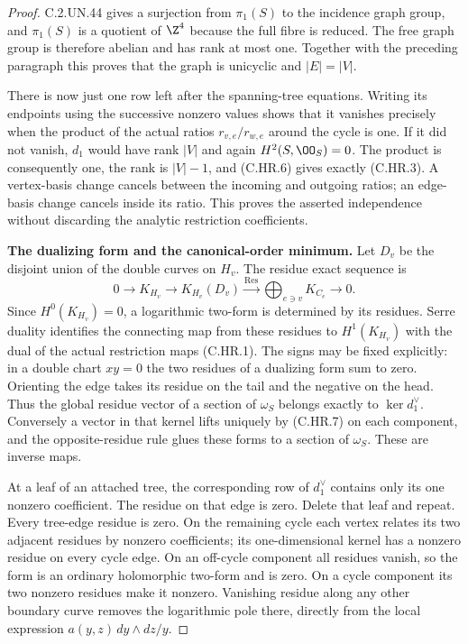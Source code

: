 \begin{proof}
C.2.UN.44 gives a surjection from $\pi_1(S)$ to the incidence
graph group, and $\pi_1(S)$ is a quotient of $\Z^4$ because the
full fibre is reduced. The free graph group is therefore abelian
and has rank at most one. Together with the preceding paragraph
this proves that the graph is unicyclic and $|E|=|V|$.

There is now just one row left after the spanning-tree equations.
Writing its endpoints using the successive nonzero values shows
that it vanishes precisely when the product of the actual ratios
$r_{v,e}/r_{w,e}$ around the cycle is one. If it did not vanish,
$d_1$ would have rank $|V|$ and again $H^2(S,\OO_S)=0$.
The product is consequently one, the rank is $|V|-1$, and
(C.HR.6) gives exactly (C.HR.3). A vertex-basis change cancels
between the incoming and outgoing ratios; an edge-basis change
cancels inside its ratio. This proves the asserted independence
without discarding the analytic restriction coefficients.

\par\medskip\noindent\textbf{The dualizing form and the canonical-order minimum.}
Let $D_v$ be the disjoint union of the double curves on $H_v$.
The residue exact sequence is
\[
 0\longrightarrow K_{H_v}
 \longrightarrow K_{H_v}(D_v)
 \xrightarrow{\operatorname{Res}}\bigoplus_{e\ni v}K_{C_e}
 \longrightarrow0.                                    \tag{C.HR.7}
\]
Since $H^0(K_{H_v})=0$, a logarithmic two-form is determined by
its residues. Serre duality identifies the connecting map from
these residues to $H^1(K_{H_v})$ with the dual of the actual
restriction maps (C.HR.1). The signs may be fixed explicitly:
in a double chart $xy=0$ the two residues of a dualizing form
sum to zero. Orienting the edge takes its residue on the tail
and the negative on the head. Thus the global residue vector of
a section of $\omega_S$ belongs exactly to $\ker d_1^\vee$.
Conversely a vector in that kernel lifts uniquely by (C.HR.7) on
each component, and the opposite-residue rule glues these forms
to a section of $\omega_S$. These are inverse maps.

At a leaf of an attached tree, the corresponding row of
$d_1^\vee$ contains only its one nonzero coefficient. The
residue on that edge is zero. Delete that leaf and repeat.
Every tree-edge residue is zero. On the remaining cycle each
vertex relates its two adjacent residues by nonzero coefficients;
its one-dimensional kernel has a nonzero residue on every cycle
edge. On an off-cycle component all residues vanish, so the
form is an ordinary holomorphic two-form and is zero. On a cycle
component its two nonzero residues make it nonzero. Vanishing
residue along any other boundary curve removes the logarithmic
pole there, directly from the local expression
$a(y,z)\,dy\wedge dz/y$.


\end{proof}
